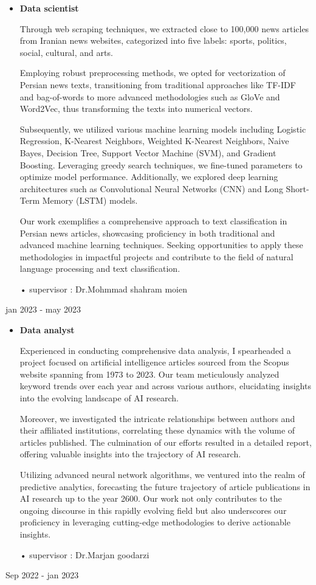 \documentclass[a4paper,9pt]{extarticle}
\begin{document}
\begin{itemize}
    \item \textbf{Data scientist}
    
Through web scraping techniques, we extracted close to 100,000 news articles from Iranian news websites, categorized into five labels: sports, politics, social, cultural, and arts.

Employing robust preprocessing methods, we opted for vectorization of Persian news texts, transitioning from traditional approaches like TF-IDF and bag-of-words to more advanced methodologies such as GloVe and Word2Vec, thus transforming the texts into numerical vectors.

Subsequently, we utilized various machine learning models including Logistic Regression, K-Nearest Neighbors, Weighted K-Nearest Neighbors, Naive Bayes, Decision Tree, Support Vector Machine (SVM), and Gradient Boosting. Leveraging greedy search techniques, we fine-tuned parameters to optimize model performance. Additionally, we explored deep learning architectures such as Convolutional Neural Networks (CNN) and Long Short-Term Memory (LSTM) models.

Our work exemplifies a comprehensive approach to text classification in Persian news articles, showcasing proficiency in both traditional and advanced machine learning techniques. Seeking opportunities to apply these methodologies in impactful projects and contribute to the field of natural language processing and text classification.

• supervisor : Dr.Mohmmad shahram moien
    
\end{itemize}\hfill jan 2023  - may 2023 %


\begin{itemize}
    \item \textbf{Data analyst}
    
Experienced in conducting comprehensive data analysis, I spearheaded a project focused on artificial intelligence articles sourced from the Scopus website spanning from 1973 to 2023. Our team meticulously analyzed keyword trends over each year and across various authors, elucidating insights into the evolving landscape of AI research.

Moreover, we investigated the intricate relationships between authors and their affiliated institutions, correlating these dynamics with the volume of articles published. The culmination of our efforts resulted in a detailed report, offering valuable insights into the trajectory of AI research.

Utilizing advanced neural network algorithms, we ventured into the realm of predictive analytics, forecasting the future trajectory of article publications in AI research up to the year 2600. Our work not only contributes to the ongoing discourse in this rapidly evolving field but also underscores our proficiency in leveraging cutting-edge methodologies to derive actionable insights.

• supervisor : Dr.Marjan goodarzi
\end{itemize}\hfill Sep 2022  - jan 2023 %
\end{document}
